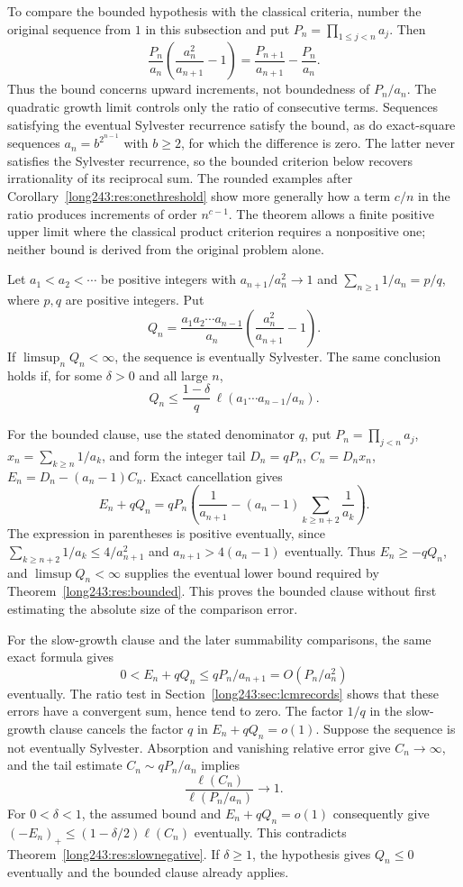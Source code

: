 To compare the bounded hypothesis with the classical criteria, number
the original sequence from $1$ in this subsection and put
$P_n=\prod_{1\le j<n}a_j$. Then
\[
 \frac{P_n}{a_n}\left(\frac{a_n^2}{a_{n+1}}-1\right)
 =\frac{P_{n+1}}{a_{n+1}}-\frac{P_n}{a_n}.
\]
Thus the bound concerns upward increments, not boundedness of $P_n/a_n$.
The quadratic growth limit controls only the ratio of consecutive terms.
Sequences satisfying the eventual Sylvester recurrence satisfy the bound, as do exact-square sequences
$a_n=b^{2^{n-1}}$ with $b\ge2$, for which the difference is zero.
The latter never satisfies the Sylvester recurrence, so the bounded
criterion below recovers irrationality of its reciprocal sum.
The rounded examples after Corollary~\ref{long243:res:onethreshold}
show more generally how a term $c/n$ in the ratio produces increments
of order $n^{c-1}$. The theorem allows a finite positive upper limit
where the classical product criterion requires a nonpositive one;
neither bound is derived from the original problem alone.

\begin{theorem}\label{long243:res:strausbounded}
Let $a_1<a_2<\cdots$ be positive integers with $a_{n+1}/a_n^2\to1$
and $\sum_{n\ge1}1/a_n=p/q$, where $p,q$ are positive integers. Put
\[
 Q_n=\frac{a_1a_2\cdots a_{n-1}}{a_n}
     \left(\frac{a_n^2}{a_{n+1}}-1\right).
\]
If $\limsup_nQ_n<\infty$, the sequence is eventually Sylvester.
The same conclusion holds if, for some $\delta>0$ and all large $n$,
\[
 Q_n\le\frac{1-\delta}{q}\,
 \ell(a_1\cdots a_{n-1}/a_n).
\]
\end{theorem}

For the bounded clause, use the stated denominator $q$, put
$P_n=\prod_{j<n}a_j$, $x_n=\sum_{k\ge n}1/a_k$, and form the integer tail
$D_n=qP_n$, $C_n=D_nx_n$, $E_n=D_n-(a_n-1)C_n$. Exact cancellation gives
\[
 E_n+qQ_n=qP_n\left(\frac1{a_{n+1}}
 -(a_n-1)\sum_{k\ge n+2}\frac1{a_k}\right).
\]
The expression in parentheses is positive eventually, since
$\sum_{k\ge n+2}1/a_k\le4/a_{n+1}^2$ and
$a_{n+1}>4(a_n-1)$ eventually. Thus $E_n\ge-qQ_n$,
and $\limsup Q_n<\infty$ supplies the eventual lower bound required
by Theorem~\ref{long243:res:bounded}. This proves the bounded clause
without first estimating the absolute size of the comparison error.

For the slow-growth clause and the later summability comparisons,
the same exact formula gives
\[
 0<E_n+qQ_n\le qP_n/a_{n+1}=O(P_n/a_n^2)
\]
eventually. The ratio test in Section~\ref{long243:sec:lcmrecords}
shows that these errors have a convergent sum, hence tend to zero.
The factor $1/q$ in the slow-growth clause cancels the factor $q$ in
$E_n+qQ_n=o(1)$. Suppose the sequence is not eventually Sylvester. Absorption
and vanishing relative error give $C_n\to\infty$, and the tail estimate
$C_n\sim qP_n/a_n$ implies
\[
 \frac{\ell(C_n)}{\ell(P_n/a_n)}\longrightarrow1.
\]
For $0<\delta<1$, the assumed bound and $E_n+qQ_n=o(1)$ consequently give
$(-E_n)_+\le(1-\delta/2)\ell(C_n)$ eventually. This contradicts
Theorem~\ref{long243:res:slownegative}. If $\delta\ge1$, the hypothesis gives
$Q_n\le0$ eventually and the bounded clause already applies.

